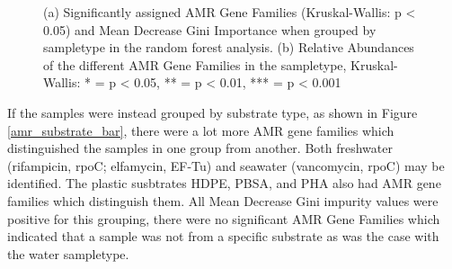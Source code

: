 \begin{figure}[h]
    \centering
    \caption{(a) Significantly assigned AMR Gene Families (Kruskal-Wallis: p < 0.05) and Mean Decrease Gini Importance when grouped by sampletype in the random forest analysis. (b) Relative Abundances of the different AMR Gene Families in the sampletype, Kruskal-Wallis: * = p < 0.05, ** = p < 0.01, *** = p < 0.001}
    \label{amr_sampletype}
\end{figure}

If the samples were instead grouped by substrate type, as shown in Figure \ref{amr_substrate_bar}, there were a lot more AMR gene families which distinguished the samples in one group from another.
Both freshwater (rifampicin, rpoC; elfamycin, EF-Tu) and seawater (vancomycin, rpoC) may be identified. The plastic susbtrates HDPE, PBSA, and PHA also had AMR gene families which distinguish them.
All Mean Decrease Gini impurity values were positive for this grouping, there were no significant AMR Gene Families which indicated that a sample was not from a specific substrate as was the case with the water sampletype. 

